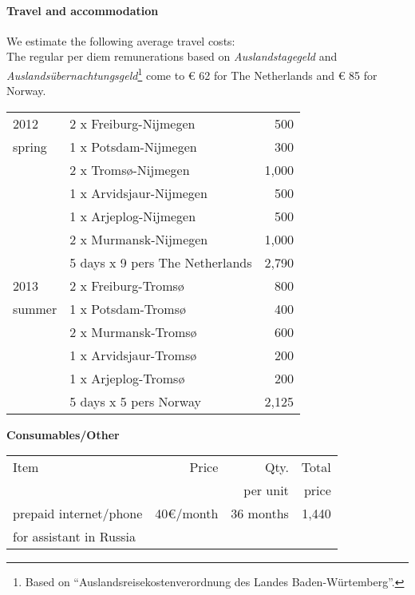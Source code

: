 \documentclass[a4paper,12pt]{article}
\begin{document}
{{{{\paragraph{Travel and accommodation}
We estimate the following average travel costs:\\

\noindent The regular per diem remunerations based on \textit{Auslandstagegeld} and \textit{Auslandsübernachtungsgeld}\footnote{Based on “Auslandsreisekostenverordnung des Landes Baden-Würtemberg”.} come to € 62 for The Netherlands and € 85 for Norway.

\begin{longtable}{| l | l | r |}
\hline
\hline
2012		& 2 x Freiburg-Nijmegen&500\\
spring	& 1 x Potsdam-Nijmegen&300\\
		& 2 x Tromsø-Nijmegen&1,000\\
		& 1 x Arvidsjaur-Nijmegen&500\\
		& 1 x Arjeplog-Nijmegen&500\\
		& 2 x Murmansk-Nijmegen&1,000\\
		& 5 days x 9 pers The Netherlands&2,790\\
\hline
2013		& 2 x Freiburg-Tromsø&800\\
summer	& 1 x Potsdam-Tromsø&400\\
		& 2 x Murmansk-Tromsø&600\\
		& 1 x Arvidsjaur-Tromsø&200\\
		& 1 x Arjeplog-Tromsø&200\\
		& 5 days x 5 pers Norway&2,125\\
\hline
\end{longtable}

\noindent \textbf{Consumables/Other}
\begin{longtable}{| l |  r | r | r |}
\hline
Item	&Price	&Qty.		&Total\\
	&	&per unit	&price\\
\hline		
prepaid internet/phone&40€/month&36 months&1,440\\
for assistant in Russia&&&\\
\hline
\end{longtable}

}}}}
\end{document}
